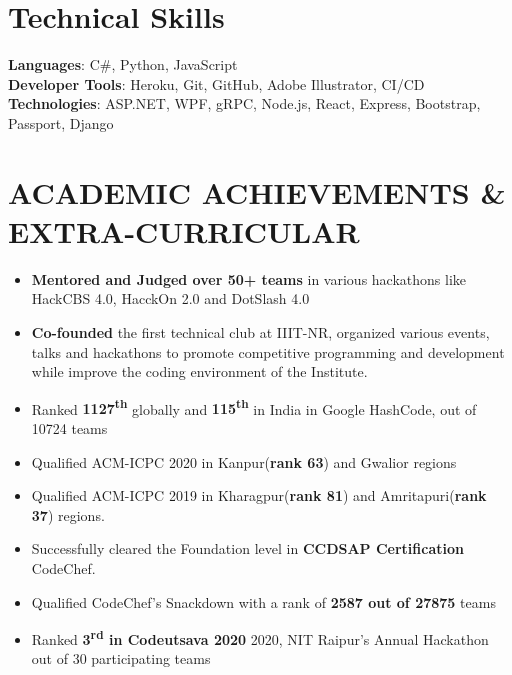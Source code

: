 \documentclass[letterpaper,11pt]{article}
\newcommand{\achievementItem}[1]{
  \item\small{
    {#1 \vspace{-6pt}}
  }
}
\newcommand{\resumeSubHeadingListEnd}{\end{itemize}}
\begin{document}
%
\section{Technical Skills}
 \begin{itemize}[leftmargin=0.15in, label={}]
    {\item{
     \textbf{Languages}{: C\#, Python, JavaScript} \\
     \vspace{1pt}
     \textbf{Developer Tools}{: Heroku, Git, GitHub, Adobe Illustrator, CI/CD} \\
     \vspace{1pt}
     \textbf{Technologies}{: ASP.NET, WPF, gRPC, Node.js, React, Express, Bootstrap, Passport, Django} \\
    }}
 \end{itemize}
 \vspace{-16pt}



\section{ACADEMIC ACHIEVEMENTS \& EXTRA-CURRICULAR}

\begin{itemize}[leftmargin=0.2in]
  \achievementItem{\textbf{Mentored and Judged over 50+ teams} in various hackathons like HackCBS 4.0, HacckOn 2.0 and DotSlash 4.0}
  \achievementItem{\textbf{Co-founded}  the  first  technical  club  at  IIIT-NR,  organized  various  events, talks and hackathons to  promote competitive programming and development while improve the coding environment of the Institute.}
  \achievementItem{Ranked \textbf{1127\textsuperscript{th}} globally and \textbf{115\textsuperscript{th}} in India in Google HashCode, out of 10724 teams}
  \achievementItem{Qualified ACM-ICPC 2020 in Kanpur(\textbf{rank 63}) and Gwalior regions}
  \achievementItem{Qualified ACM-ICPC 2019 in Kharagpur(\textbf{rank 81}) and Amritapuri(\textbf{rank 37}) regions.}
  \achievementItem{Successfully cleared the Foundation level in \textbf{CCDSAP Certification} CodeChef.}
  \achievementItem{Qualified CodeChef’s Snackdown with a rank of \textbf{2587 out of 27875}  teams}
  \achievementItem{Ranked {\bf 3\textsuperscript{rd} in Codeutsava 2020} 2020, NIT Raipur’s Annual Hackathon out of 30 participating teams}
\end{itemize}
        
\end{document}
